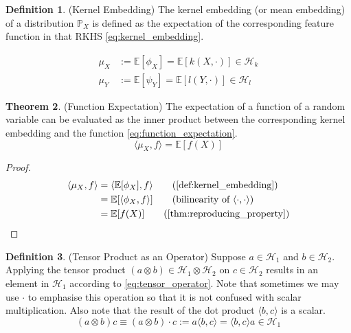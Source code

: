 \documentclass[twoside]{article} \usepackage{aistats2017}
\theoremstyle{definition}
\newtheorem{theorem}{Theorem}[section]
\newtheorem{definition}[theorem]{Definition}
\newcommand{\rv}[1]{{#1}}
\newcommand{\expect}[1]{{\mathbb{E}[#1]}}
\newcommand{\inner}[2]{{\langle #1, #2 \rangle}}
\newcommand{\Hk}{\mathcal{H}_{k}}
\newcommand{\Hl}{\mathcal{H}_{l}}
\newcommand{\muX}{\mu_{\rv{X}}}
\newcommand{\muY}{\mu_{\rv{Y}}}
\newcommand{\phiX}{\phi_{\rv{X}}}
\newcommand{\psiY}{\psi_{\rv{Y}}}
\begin{document}
		\begin{definition} \label{def:kernel_embedding}
			(Kernel Embedding)
			The kernel embedding (or mean embedding) of a distribution $\mathbb{P}_{\rv{X}}$ is defined as the expectation of the corresponding feature function in that RKHS \eqref{eq:kernel_embedding}.
			
			\begin{equation}
			\begin{aligned}
				\muX &:= \expect{\phiX} = \expect{k(\rv{X}, \cdot)} \in \Hk \\
				\muY &:= \expect{\psiY} = \expect{l(\rv{Y}, \cdot)} \in \Hl
			\label{eq:kernel_embedding}
			\end{aligned}
			\end{equation}	
		\end{definition}
	
		\begin{theorem} \label{thm:function_expectation}
			(Function Expectation)
			The expectation of a function of a random variable can be evaluated as the inner product between the corresponding kernel embedding and the function \eqref{eq:function_expectation}.
			\begin{equation}
				\inner{\muX}{f} = \expect{f(\rv{X})}
				\label{eq:function_expectation}
			\end{equation}
			
			\begin{proof}
				\begin{align*}
					\inner{\muX}{f} &= \inner{\expect{\phiX}}{f} \tag{\cref{def:kernel_embedding}} \\
					&= \expect{\inner{\phiX}{f}} \tag{bilinearity of $\inner{\cdot}{\cdot}$} \\
					&= \expect{f(\rv{X})} \tag{\cref{thm:reproducing_property}}
				\end{align*}
			\end{proof}
		\end{theorem}
		
		\begin{definition} \label{def:tensor_operator}
			(Tensor Product as an Operator)
			Suppose $a \in \mathcal{H}_{1}$ and $b \in \mathcal{H}_{2}$. Applying the tensor product $(a \otimes b) \in \mathcal{H}_{1} \otimes \mathcal{H}_{2}$ on $c \in \mathcal{H}_{2}$ results in an element in $\mathcal{H}_{1}$ according to \eqref{eq:tensor_operator}. Note that sometimes we may use $\cdot$ to emphasise this operation so that it is not confused with scalar multiplication. Also note that the result of the dot product $\langle b, c \rangle$ is a scalar.
			\begin{equation}
				(a \otimes b) c \equiv (a \otimes b) \cdot c := a \langle b, c \rangle = \langle b, c \rangle a \in \mathcal{H}_{1}
			\label{eq:tensor_operator}
			\end{equation}
		\end{definition}
		
\end{document}
